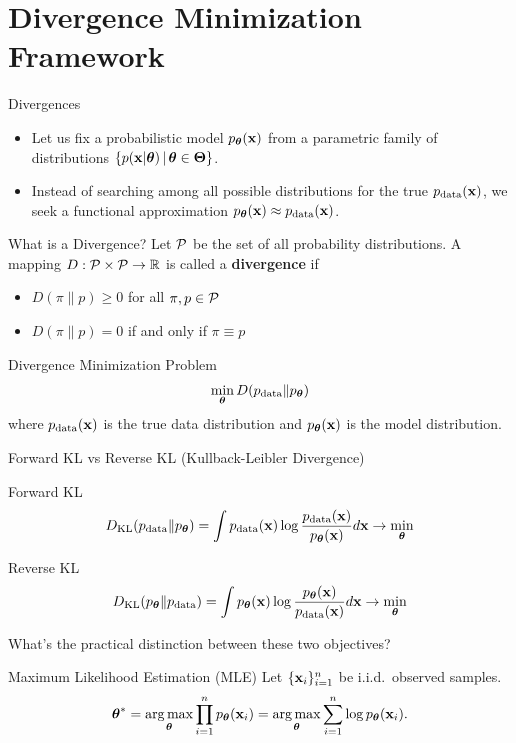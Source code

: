 \documentclass{beamer}
\begin{document}
\section{Divergence Minimization Framework}
\begin{frame}{Divergences}
	\begin{itemize}
	\item Let us fix a probabilistic model $p_{\boldsymbol{\theta}}(\mathbf{x})$ from a parametric family of distributions $\{p(\mathbf{x} | \boldsymbol{\theta}) \, | \, \boldsymbol{\theta} \in \boldsymbol{\Theta}\}$.\\
        \eqpause
	\item Instead of searching among all possible distributions for the true $p_{\text{data}}(\mathbf{x})$, we seek a functional approximation $p_{\boldsymbol{\theta}}(\mathbf{x}) \approx p_{\text{data}}(\mathbf{x})$.
	\end{itemize}
    \eqpause
	\begin{block}{What is a Divergence?}
		Let $\mathcal{P}$ be the set of all probability distributions. A mapping $D: \mathcal{P} \times \mathcal{P} \to \mathbb{R}$ is called a \textbf{divergence} if 
		\begin{itemize}
			\item $D(\pi \| p) \geq 0$ for all $\pi, p \in \mathcal{P}$
			\item $D(\pi \| p) = 0$ if and only if $\pi \equiv p$
		\end{itemize}
	\end{block}
    \eqpause
	\begin{block}{Divergence Minimization Problem}
		\vspace{-0.3cm}
		$$
		\min_{\boldsymbol{\theta}} D(p_{\text{data}} \| p_{\boldsymbol{\theta}})
		$$
		where $p_{\text{data}}(\mathbf{x})$ is the true data distribution and $p_{\boldsymbol{\theta}}(\mathbf{x})$ is the model distribution.
	\end{block}
\end{frame}
\begin{frame}{Forward KL vs Reverse KL (Kullback-Leibler Divergence)}
	\begin{block}{Forward KL}
		\vspace{-0.2cm}
		\[
			D_\mathrm{KL}(p_{\text{data}} \| p_{\boldsymbol{\theta}}) = \int p_{\text{data}}(\mathbf{x}) \log \frac{p_{\text{data}}(\mathbf{x})}{p_{\boldsymbol{\theta}}(\mathbf{x})} d \mathbf{x} \rightarrow \min_{\boldsymbol{\theta}}
		\]
	\end{block}
    \eqpause
	\begin{block}{Reverse KL}
		\vspace{-0.2cm}
		\[
			D_\mathrm{KL}(p_{\boldsymbol{\theta}} \| p_{\text{data}}) = \int p_{\boldsymbol{\theta}}(\mathbf{x}) \log \frac{p_{\boldsymbol{\theta}}(\mathbf{x})}{p_{\text{data}}(\mathbf{x})} d \mathbf{x} \rightarrow \min_{\boldsymbol{\theta}}
		\]
	\end{block}
    \eqpause
	What's the practical distinction between these two objectives?
    \eqpause
	\begin{block}{Maximum Likelihood Estimation (MLE)}
	Let $\{\mathbf{x}_i\}_{i=1}^n$ be i.i.d.\ observed samples.
		\vspace{-0.3cm}
		\[
			\boldsymbol{\theta}^* = \operatorname*{arg\,max}_{\boldsymbol{\theta}} \prod_{i=1}^n p_{\boldsymbol{\theta}}(\mathbf{x}_i) = \operatorname*{arg\,max}_{\boldsymbol{\theta}} \sum_{i=1}^n \log p_{\boldsymbol{\theta}}(\mathbf{x}_i).
		\]
	\end{block}
\end{frame}
\end{document}
